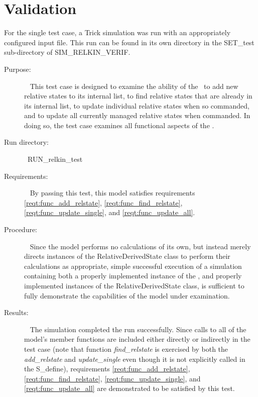 \section{Validation}
For the single test case, a Trick simulation was run with an appropriately
configured input file. This run can be found in its own directory in the
SET\_test sub-directory of SIM\_RELKIN\_VERIF.


\label{test:relkin_test}
\begin{description}
\item[Purpose:]\ \newline
This test case is designed to examine the ability of the \relkinDesc\ to
add new relative states to its internal list, to find relative states that
are already in its internal list, to update individual relative states when
so commanded, and to update all currently managed relative states when
commanded. In doing so, the test case examines all functional aspects of the
\relkinDesc.
\item[Run directory:]\ \newline RUN\_relkin\_test
\item[Requirements:]\ \newline
By passing this test, this model satisfies requirements
\mbox{\ref{reqt:func_add_relstate}}, \mbox{\ref{reqt:func_find_relstate}},
\mbox{\ref{reqt:func_update_single}}, and \mbox{\ref{reqt:func_update_all}}.

\item[Procedure:]\ \newline
Since the model performs no calculations of its own, but instead merely directs
instances of the RelativeDerivedState class to perform their calculations as
appropriate, simple successful execution of a simulation containing both a
properly implemented instance of the \relkinDesc, and properly implemented
instances of the RelativeDerivedState class, is sufficient to fully demonstrate
the capabilities of the model under examination.

\item[Results:]\ \newline
The simulation completed the run successfully. Since calls to all of the
model's member functions are included either directly or indirectly in the test
case (note that function {\em find\_relstate} is exercised by both the
{\em add\_relstate} and {\em update\_single} even though it is not explicitly
called in the S\_define), requirements
\mbox{\ref{reqt:func_add_relstate}}, \mbox{\ref{reqt:func_find_relstate}},
\mbox{\ref{reqt:func_update_single}}, and \mbox{\ref{reqt:func_update_all}}
are demonstrated to be satisfied by this test.
\end{description}


